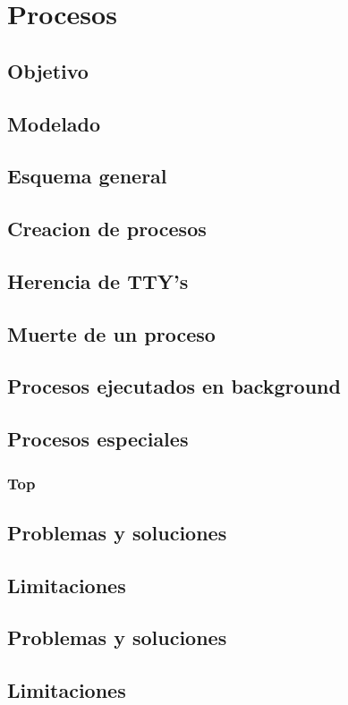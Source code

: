 \documentclass[10pt,a4paper]{article}
\begin{document}
\section{Procesos}
	\subsection{Objetivo}
	\subsection{Modelado}
	\subsection{Esquema general}
	\subsection{Creacion de procesos}
	\subsection{Herencia de TTY's}
	\subsection{Muerte de un proceso}
	\subsection{Procesos ejecutados en background}
	\subsection{Procesos especiales}
	\subsubsection{Top}
	\subsection{Problemas y soluciones}
	\subsection{Limitaciones}

\subsection{Problemas y soluciones}
	\subsection{Limitaciones}
\end{document}
